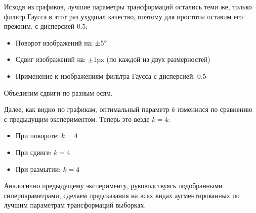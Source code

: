 \documentclass[12pt]{article}
\begin{document}
Исходя из графиков, лучшие параметры трансформаций остались теми же, только фильтр Гаусса в этот раз ухудшал качество, поэтому для простоты оставим его прежним, с дисперсией $0.5$:
\begin{itemize}
    \item Поворот изображений на: $\pm5\degree$
    \item Сдвиг изображений на: $\pm1$px (по каждой из двух размерностей)
    \item Применение к изображениям фильтра Гаусса с дисперсией: $0.5$
\end{itemize}
Объединим сдвиги по разным осям.

Далее, как видно по графикам, оптимальный параметр $k$ изменился по сравнению с предыдущим экспериментом. Теперь это везде $k = 4$:
\begin{itemize}
    \item При повороте: $k = 4$
    \item При сдвиге: $k = 4$
    \item При размытии: $k = 4$
\end{itemize}

Аналогично предыдущему эксперименту, руководствуясь подобранными гиперпараметрами, сделаем предсказания на всех видах аугментированных по лучшим параметрам трансформаций выборках.

\break
\end{document}
